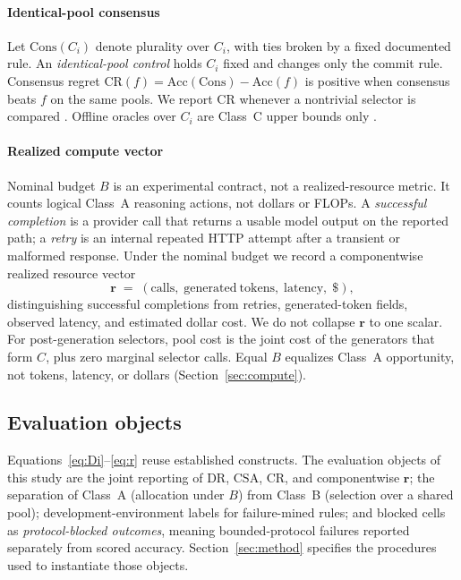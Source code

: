 \paragraph{Identical-pool consensus}
Let $\mathrm{Cons}(C_i)$ denote plurality over $C_i$, with ties broken by a fixed documented rule.
An \emph{identical-pool control} holds $C_i$ fixed and changes only the commit rule. Consensus regret
$\mathrm{CR}(f)=\mathrm{Acc}(\mathrm{Cons})-\mathrm{Acc}(f)$ is positive when consensus beats $f$ on
the same pools. We report $\mathrm{CR}$ whenever a nontrivial selector is compared
\citep{selfconsistency,universal_sc}. Offline oracles over $C_i$ are Class~C upper bounds only
\citep{oracle_gap}.

\paragraph{Realized compute vector}
Nominal budget $B$ is an experimental contract, not a realized-resource metric. It counts logical
Class~A reasoning actions, not dollars or FLOPs. A \emph{successful completion} is a provider call
that returns a usable model output on the reported path; a \emph{retry} is an internal repeated HTTP
attempt after a transient or malformed response. Under the nominal budget we record a componentwise
realized resource vector
\begin{equation}
\label{eq:r}
\mathbf{r} \;=\; (\mathrm{calls},\;\mathrm{generated\ tokens},\;\mathrm{latency},\;\$),
\end{equation}
distinguishing successful completions from retries, generated-token fields, observed latency, and
estimated dollar cost. We do not collapse $\mathbf{r}$ to one scalar. For
post-generation selectors, pool cost is the joint cost of the generators that form $C$, plus zero
marginal selector calls. Equal $B$ equalizes Class~A opportunity, not tokens, latency, or dollars
(Section~\ref{sec:compute}).

\subsection{Evaluation objects}
\label{sec:relation-oracle}

Equations~\eqref{eq:Di}--\eqref{eq:r} reuse established constructs. The evaluation objects of this
study are the joint reporting of $\mathrm{DR}$, $\mathrm{CSA}$, $\mathrm{CR}$, and componentwise
$\mathbf{r}$; the separation of Class~A (allocation under $B$) from Class~B (selection over a shared
pool); development-environment labels for failure-mined rules; and blocked cells as
\emph{protocol-blocked outcomes}, meaning bounded-protocol failures reported separately from scored
accuracy. Section~\ref{sec:method} specifies the procedures used to instantiate those objects.
